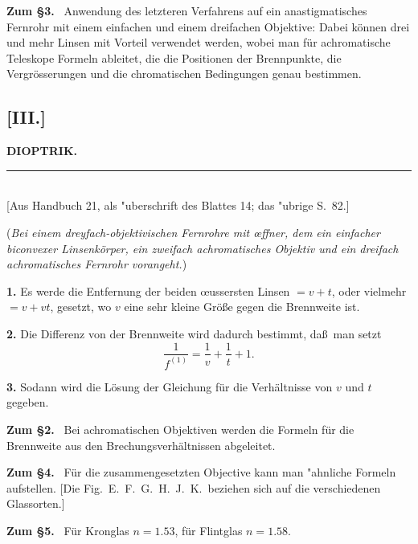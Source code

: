 \documentclass[12pt,a4paper]{article}
\theoremstyle{plain}
\theoremstyle{definition}
\theoremstyle{remark}
\begin{document}
\textbf{Zum \S 3.} \ Anwendung des letzteren Verfahrens auf ein
anastigmatisches Fernrohr mit einem einfachen und einem dreifachen
Objektive: Dabei k\"onnen drei und mehr Linsen mit Vorteil verwendet
werden, wobei man f\"ur achromatische Teleskope Formeln ableitet, die
die Positionen der Brennpunkte, die Vergr\"osserungen und die
chromatischen Bedingungen genau bestimmen.


\subsection*{[III.]}
\begin{center}
\textbf{DIOPTRIK.}
\end{center}
\begin{center}
\rule{6cm}{0.4pt}\\[4pt]
[Aus Handbuch 21, als "uberschrift des Blattes 14; das "ubrige S.~82.]
\end{center}

\noindent
(\textit{Bei einem dreyfach-objektivischen Fernrohre mit \oe ffner,
dem ein einfacher biconvexer Linsenk\"orper, ein zweifach achromatisches
Objektiv und ein dreifach achromatisches Fernrohr vorangeht.})

\medskip

\noindent
\textbf{1.} Es werde die Entfernung der beiden \oe ussersten Linsen
$= v + t$, oder vielmehr $= v + vt$, gesetzt, wo $v$ eine sehr kleine
Gr\"o\ss e gegen die Brennweite ist.

\noindent
\textbf{2.} Die Differenz von der Brennweite wird dadurch bestimmt,
da\ss\ man setzt
\[
\frac{1}{f^{(1)}} = \frac{1}{v} + \frac{1}{t} + 1.
\]

\noindent
\textbf{3.} Sodann wird die L\"osung der Gleichung f\"ur die
Verh\"altnisse von $v$ und $t$ gegeben.

\medskip

\noindent
\textbf{Zum \S 2.} \ Bei achromatischen Objektiven werden die
Formeln f\"ur die Brennweite aus den Brechungsverh\"altnissen abgeleitet.

\noindent
\textbf{Zum \S 4.} \ F\"ur die zusammengesetzten Objective kann man
"ahnliche Formeln aufstellen. [Die Fig.~E.~F.~G.~H.~J.~K.~beziehen
sich auf die verschiedenen Glassorten.]

\noindent
\textbf{Zum \S 5.} \ F\"ur Kronglas $n = 1.53$, f\"ur Flintglas
$n = 1.58$.
\end{document}
